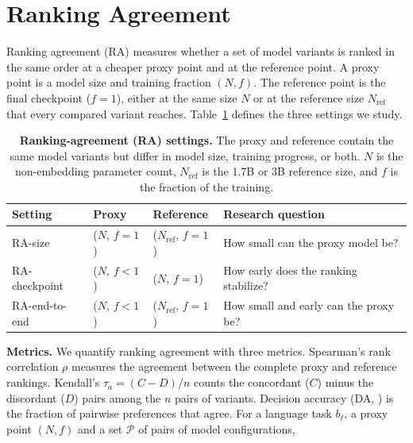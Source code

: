 \clearpage

\section{Ranking Agreement}
\label{app:ranking-agreement}

Ranking agreement (RA) measures whether a set of model variants is ranked in the same order at a cheaper proxy point and at the reference point. A proxy point is a model size and training fraction $(N,f)$. The reference point is the final checkpoint ($f=1$), either at the same size $N$ or at the reference size $N_{\mathrm{ref}}$ that every compared variant reaches. Table~\ref{tab:ra_defs} defines the three settings we study.

\begin{table}[t!]
    \centering
    \begin{tabular}{llll}
        \toprule
        Setting & Proxy & Reference & Research question \\
        \midrule
        RA-size
            & ($N$, $f=1$)
            & ($N_{\mathrm{ref}}$, $f=1$)
            & How small can the proxy model be? \\
        RA-checkpoint
            & ($N$, $f<1$)
            & ($N$, \quad $f=1$)
            & How early does the ranking stabilize? \\
        RA-end-to-end
            & ($N$, $f<1$)
            & ($N_{\mathrm{ref}}$, $f=1$)
            & How small and early can the proxy be? \\
        \bottomrule
    \end{tabular}
        \caption{\textbf{Ranking-agreement (RA) settings.} The proxy and reference contain the same model variants but differ in model size, training progress, or both. $N$ is the non-embedding parameter count, $N_{\mathrm{ref}}$ is the 1.7B or 3B reference size, and $f$ is the fraction of the training.}
    \label{tab:ra_defs}
\end{table}

\textbf{Metrics.} We quantify ranking agreement with three metrics. Spearman's rank correlation $\rho$ measures the agreement between the complete proxy and reference rankings. Kendall's $\tau_a = (C-D)/n$ counts the concordant ($C$) minus the discordant ($D$) pairs among the $n$ pairs of variants. Decision accuracy (DA, \citealp{heineman_signal_2025}) is the fraction of pairwise preferences that agree. For a language task $b_\ell$, a proxy point $(N,f)$ and a set $\mathcal{P}$ of pairs of model configurations,

